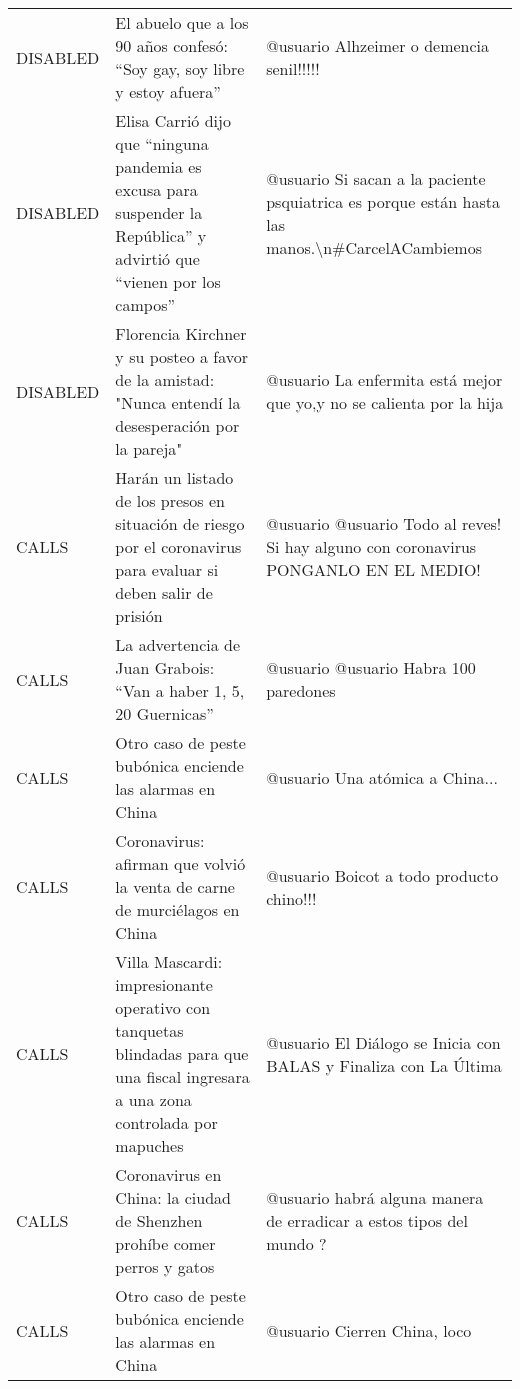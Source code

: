 \begin{table}
\begin{tabularx}{\textwidth}{l X X}
     DISABLED & El abuelo que a los 90 años confesó: “Soy gay, soy libre y estoy afuera” & @usuario Alhzeimer o demencia senil!!!!! \\
     DISABLED & Elisa Carrió dijo que “ninguna pandemia es excusa para suspender la República” y advirtió que “vienen por los campos” & @usuario Si sacan a la paciente psquiatrica es porque están hasta las manos.\textbackslash n\#CarcelACambiemos \\
     DISABLED & Florencia Kirchner y su posteo a favor de la amistad: "Nunca entendí la desesperación por la pareja" & @usuario La enfermita está mejor que yo,y no se calienta por la hija \\
        CALLS & Harán un listado de los presos en situación de riesgo por el coronavirus para evaluar si deben salir de prisión & @usuario @usuario Todo al reves! Si hay alguno con coronavirus PONGANLO EN EL MEDIO! \\
        CALLS & La advertencia de Juan Grabois: “Van a haber 1, 5, 20 Guernicas” & @usuario @usuario Habra 100 paredones \\
        CALLS & Otro caso de peste bubónica enciende las alarmas en China & @usuario Una atómica a China... \\
        CALLS & Coronavirus: afirman que volvió la venta de carne de murciélagos en China & @usuario Boicot a todo producto chino!!! \\
        CALLS & Villa Mascardi: impresionante operativo con tanquetas blindadas para que una fiscal ingresara a una zona controlada por mapuches & @usuario El Diálogo se Inicia con BALAS y Finaliza con La Última \\
        CALLS & Coronavirus en China: la ciudad de Shenzhen prohíbe comer perros y gatos & @usuario habrá alguna manera de erradicar a estos tipos del mundo ? \\
        CALLS & Otro caso de peste bubónica enciende las alarmas en China & @usuario Cierren China, loco \\
    \end{tabularx}
\end{table}